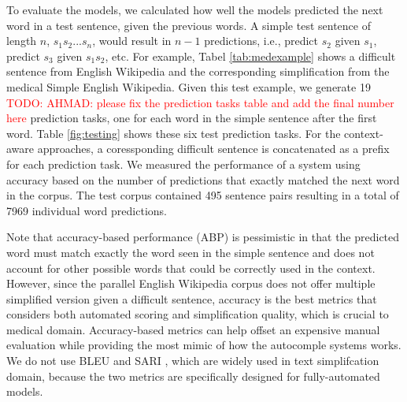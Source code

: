 \documentclass[11pt]{article}
\newcommand{\todo}[1]{\textcolor{red}{TODO: #1}}
\begin{document}
To evaluate the models, we calculated how well the models predicted the next word in a test sentence, given the previous words.  A simple test sentence of length $n$, $s_1 s_2 ... s_n$, would result in $n-1$ predictions, i.e., predict $s_2$ given $s_1$, predict $s_3$ given $s_1 s_2$, etc.  For example, Tabel \ref{tab:medexample} shows a difficult sentence from English Wikipedia and the corresponding simplification from the medical Simple English Wikipedia. Given this test example, we generate 19 \todo{AHMAD: please fix the prediction tasks table and add the final number here} prediction tasks, one for each word in the simple sentence after the first word.  Table \ref{fig:testing} shows these six test prediction tasks.  For the context-aware approaches, a coressponding difficult sentence is concatenated as a prefix for each prediction task. We measured the performance of a system using accuracy based on the number of predictions that exactly matched the next word in the corpus.  The test corpus contained 495 sentence pairs resulting in a total of 7969 individual word predictions. 

Note that accuracy-based performance (ABP) is pessimistic in that the predicted word must match exactly the word seen in the simple sentence and does not account for other possible words that could be correctly used in the context. However, since the parallel English Wikipedia corpus does not offer multiple simplified version given a difficult sentence, accuracy is the best metrics that considers both automated scoring and simplification quality, which is crucial to medical domain. Accuracy-based metrics can help offset an expensive manual evaluation while providing the most mimic of how the autocomple systems works. We do not use BLEU \cite{papineni2002bleu} and SARI \cite{xu2016optimizing}, which are widely used in text simplifcation domain, because the two metrics are specifically designed for fully-automated models.

\begin{table}
    \centering
    \caption{An example sentence pair from the English Wikipedia corpus.\todo{AHMAD: after you finished Medical Corpora part, please fix this table with a medical example.}}
    \label{tab:testexample}
\end{table}
\end{document}
